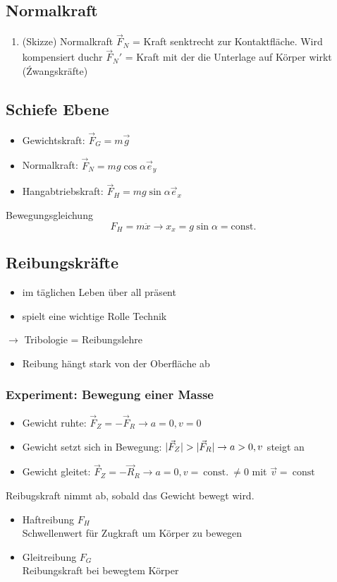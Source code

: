 \documentclass[a4paper]{scrartcl}
\DeclarePairedDelimiter\abs{\lvert}{\rvert}%
\renewcommand{\v}[1]{\vec{#1}}
\begin{document}
\subsection{Normalkraft}
\label{sec-8-5}
\begin{enumerate}
\item (Skizze) Normalkraft $\v{F}_N$ = Kraft senktrecht zur Kontaktfläche. Wird kompensiert duchr $\v{F}_N'$ = Kraft mit der die Unterlage auf Körper wirkt (Źwangskräfte)
\end{enumerate}
\subsection{Schiefe Ebene}
\label{sec-8-6}
\begin{itemize}
\item Gewichtskraft: $\v{F}_G = m\v g$
\item Normalkraft: $\v{F}_N = m g\cos{\alpha} \v{e}_y$
\item Hangabtriebskraft: $\v{F}_H = m g\sin{\alpha} \v{e}_x$
\end{itemize}
Bewegungsgleichung
\[F_H = m\ddot{x} \rightarrow x_x = g\sin{\alpha} =\text{const.}\]
\subsection{Reibungskräfte}
\label{sec-8-7}
\begin{itemize}
\item im täglichen Leben über all präsent
\item spielt eine wichtige Rolle Technik
\end{itemize}
$\rightarrow$ Tribologie = Reibungslehre
\begin{itemize}
\item Reibung hängt stark von der Oberfläche ab
\end{itemize}
\subsubsection{Experiment: Bewegung einer Masse}
\label{sec-8-7-1}
\begin{itemize}
\item Gewicht ruhte: $\v{F}_Z = - \v{F}_R \to a = 0, v = 0$
\item Gewicht setzt sich in Bewegung: $\abs{\v{F}_Z} > \abs{\v{F}_R} \to a > 0,v$ steigt an
\item Gewicht gleitet: $\v{F}_Z = - \v{R}_R \to a = 0, v =~\text{const.}~\neq 0$ mit $\v v =~\text{const}~$
\end{itemize}
Reibugskraft nimmt ab, sobald das Gewicht bewegt wird.
\begin{itemize}
\item Haftreibung $F_H$ \\
       Schwellenwert für Zugkraft um Körper zu bewegen
\item Gleitreibung $F_G$ \\
       Reibungskraft bei bewegtem Körper
\end{itemize}
\end{document}
